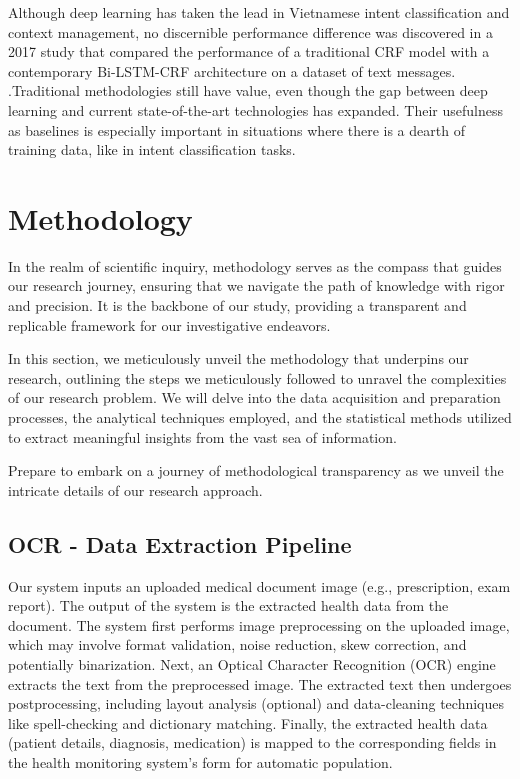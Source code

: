 \documentclass[conference]{IEEEtran}
\begin{document}
   Although deep learning has taken the lead in Vietnamese intent classification and context management, no discernible performance difference was discovered in a 2017 study that compared the performance of a traditional CRF model with a contemporary Bi-LSTM-CRF architecture on a dataset of text messages. \cite{ngo2017identification}.Traditional methodologies still have value, even though the gap between deep learning and current state-of-the-art technologies has expanded. Their usefulness as baselines is especially important in situations where there is a dearth of training data, like in intent classification tasks.

\section{Methodology}
\label{method}
    In the realm of scientific inquiry, methodology serves as the compass that guides our research journey, ensuring that we navigate the path of knowledge with rigor and precision. It is the backbone of our study, providing a transparent and replicable framework for our investigative endeavors.

    In this section, we meticulously unveil the methodology that underpins our research, outlining the steps we meticulously followed to unravel the complexities of our research problem. We will delve into the data acquisition and preparation processes, the analytical techniques employed, and the statistical methods utilized to extract meaningful insights from the vast sea of information.

    Prepare to embark on a journey of methodological transparency as we unveil the intricate details of our research approach.
    \subsection{OCR - Data Extraction Pipeline}
    Our system inputs an uploaded medical document image (e.g., prescription, exam report). The output of the system is the extracted health data from the document. The system first performs image preprocessing on the uploaded image, which may involve format validation, noise reduction, skew correction, and potentially binarization. Next, an Optical Character Recognition (OCR) engine extracts the text from the preprocessed image. The extracted text then undergoes postprocessing, including layout analysis (optional) and data-cleaning techniques like spell-checking and dictionary matching. Finally, the extracted health data (patient details, diagnosis, medication) is mapped to the corresponding fields in the health monitoring system's form for automatic population.
    
\end{document}
